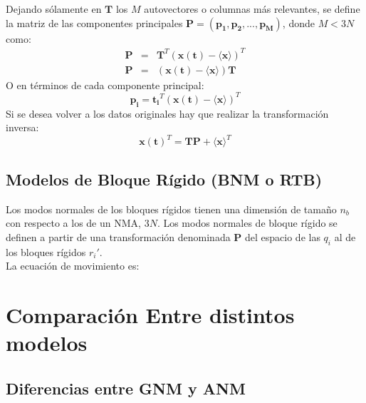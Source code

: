 Dejando s\'{o}lamente en $\mathbf{T}$ los $M$ autovectores o columnas m\'{a}s relevantes, se define la matriz de las componentes principales $\mathbf{P}=\left(\mathbf{p_1},\mathbf{p_2},...,\mathbf{p_{M}}\right)$, donde $M<3N$ como:
\begin{eqnarray}\label{eq:31}
\mathbf{P}&=&\mathbf{T}^T(\mathbf{x(t)}-\langle\mathbf{x}\rangle)^T \nonumber \\
\mathbf{P}&=&(\mathbf{x(t)}-\langle\mathbf{x}\rangle)\mathbf{T}
\end{eqnarray}
O en t\'{e}rminos de cada componente principal:
\begin{equation}\label{eq:32}
\mathbf{p_i}=\mathbf{t_i}^T(\mathbf{x(t)}-\langle\mathbf{x}\rangle)^T
\end{equation}
Si se desea volver a los datos originales hay que realizar la transformaci\'{o}n inversa:
\begin{equation}\label{eq:33}
\mathbf{x(t)}^T=\mathbf{T}\mathbf{P}+\langle\mathbf{x}\rangle^T
\end{equation}
\subsection{Modelos de Bloque R\'{i}gido (BNM o RTB)}
Los modos normales de los bloques r\'{i}gidos tienen una dimensi\'{o}n de tama\~{n}o $n_b$ con respecto a los de un NMA, $3N$. Los modos normales de bloque r\'{i}gido se definen a partir de una transformaci\'{o}n denominada $\mathbf{P}$ del espacio de las ${q_i}$ al de los bloques r\'{i}gidos $r_i'$.\\

La ecuaci\'{o}n de movimiento es:

\section{Comparaci\'{o}n Entre distintos modelos}
\subsection{Diferencias entre GNM y ANM}
